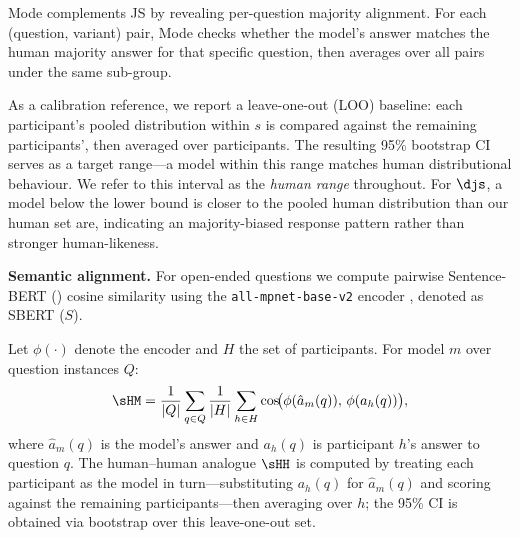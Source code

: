 Mode complements JS by revealing per-question majority alignment. 
For each (question, variant) pair, Mode checks whether the model's answer matches the human majority answer for that specific question, then averages over all pairs under the same sub-group.

As a calibration reference, we report a leave-one-out (LOO) baseline: each participant's pooled distribution within $s$ is compared against the remaining participants', then averaged over participants. The resulting 95\% bootstrap CI serves as a target range---a model within this range matches human distributional behaviour.
We refer to this interval as the \textit{human range} throughout.
For $\djs$, a model below the lower bound is closer to the pooled human distribution than our human set are, indicating an majority-biased response pattern rather than stronger human-likeness.%

\textbf{Semantic alignment.} For open-ended questions we compute pairwise Sentence-BERT (\citealt{reimers2019sentence}) cosine similarity using the \texttt{all-mpnet-base-v2} encoder \citep{song2020mpnet}, denoted as SBERT ($S$).

Let $\phi(\cdot)$ denote the encoder and $H$ the set of participants.
For model $m$ over question instances $Q$:
\begin{equation}
  \sHM = \frac{1}{|Q|}\sum_{q\in Q}\frac{1}{|H|}\sum_{h\in H}\cos\!\bigl(\phi(\hat{a}_{m}(q)),\,\phi(a_{h}(q))\bigr),
  \label{eq:sbert}
\end{equation}
where $\hat{a}_{m}(q)$ is the model's answer and $a_{h}(q)$ is participant $h$'s answer to question $q$.
The human--human analogue $\sHH$ is computed by treating each participant as the model in turn---substituting $a_{h}(q)$ for $\hat{a}_{m}(q)$ and scoring against the remaining participants---then averaging over $h$; the 95\% CI is obtained via bootstrap over this leave-one-out set.

